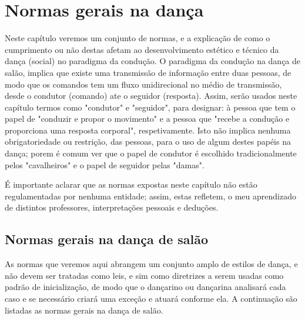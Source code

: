 
\chapter{Normas gerais na dança}
Neste capítulo veremos um conjunto de normas, e a explicação de como o cumprimento
ou não destas afetam ao desenvolvimento estético e técnico da dança (social) no paradigma 
da condução. 
O paradigma da condução na dança de salão, implica que existe uma transmissão de informação
entre duas pessoas, de modo que os comandos tem um fluxo unidirecional no médio de transmissão,
desde o condutor (comando) ate o seguidor (resposta). 
Assim, serão usados neste capítulo termos como "condutor" e "seguidor", 
para designar: à pessoa que tem o papel de "conduzir e propor o movimento" 
e a pessoa que "recebe a condução e proporciona uma resposta corporal", respetivamente.
Isto não implica nenhuma obrigatoriedade ou restrição, das pessoas, para o uso de algum destes papéis na dança;
porem é comum ver que o papel de condutor é escolhido tradicionalmente pelos "cavalheiros" e o papel de seguidor pelas "damas".
\begin{lattention}
É importante aclarar
que as normas expostas neste capítulo não estão regulamentadas por nenhuma entidade; assim, estas
refletem, o meu aprendizado de distintos professores,
interpretações pessoais  e deduções. 
\end{lattention}

\section{Normas gerais na dança de salão}
As normas que veremos aqui abrangem um conjunto amplo de estilos de 
dança, e não devem ser
tratadas como leis, e sim como diretrizes a serem usadas como padrão de inicialização, de modo que 
o dançarino ou dançarina analisará cada caso e se necessário criará uma exceção e atuará conforme ela.
A continuação são listadas as normas gerais na dança de salão.\\

